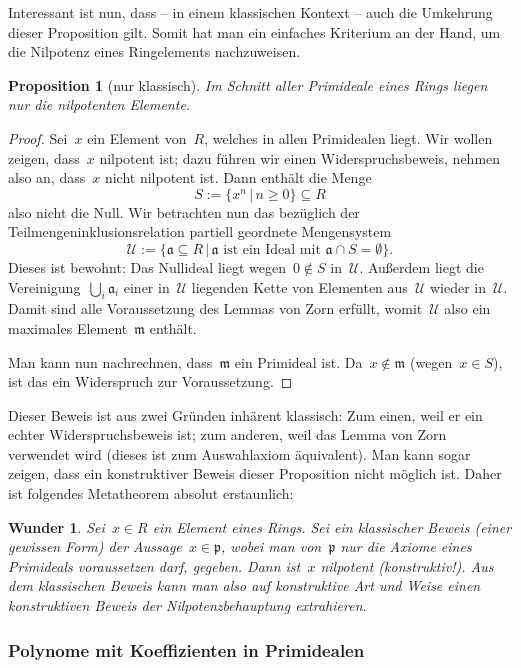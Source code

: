 \documentclass[a4paper,ngerman,12pt]{scrartcl}
\theoremstyle{definition}
\theoremstyle{plain}
\newtheorem{prop}[defn]{Proposition}
\newtheorem{wunder}[defn]{Wunder}
\theoremstyle{remark}
\renewcommand{\aa}{\mathfrak{a}}
\newcommand{\pp}{\mathfrak{p}}
\newcommand{\mm}{\mathfrak{m}}
\newcommand{\U}{\mathcal{U}}
\renewcommand{\_}{\mathpunct{.}\,}
\newcommand{\?}{\,{:}\,}
\begin{document}
Interessant ist nun, dass -- in einem klassischen Kontext -- auch die Umkehrung
dieser Proposition gilt. Somit hat man ein einfaches Kriterium an der Hand, um
die Nilpotenz eines Ringelements nachzuweisen.

\begin{prop}[nur klassisch]\label{intersectprim}%
Im Schnitt aller Primideale eines Rings liegen nur
die nilpotenten Elemente.\end{prop}
\begin{proof}Sei~$x$ ein Element von~$R$, welches in allen Primidealen liegt.
Wir wollen zeigen, dass~$x$ nilpotent ist; dazu führen wir einen
Widerspruchsbeweis, nehmen also an, dass~$x$ nicht nilpotent ist. Dann enthält
die Menge
\[ S := \{ x^n \,|\, n \geq 0 \} \subseteq R \]
also nicht die Null. Wir betrachten nun das bezüglich der
Teilmengeninklusionsrelation partiell geordnete Mengensystem
\[ \U := \{ \aa \subseteq R \,|\, \text{$\aa$ ist ein Ideal mit~$\aa \cap S =
\emptyset$} \}. \]
Dieses ist bewohnt: Das Nullideal liegt wegen~$0 \not\in S$ in~$\U$. Außerdem
liegt die Vereinigung~$\bigcup_i \aa_i$ einer in~$\U$ liegenden Kette von
Elementen aus~$\U$ wieder in~$\U$. Damit sind alle Voraussetzung des Lemmas von
Zorn erfüllt, womit~$\U$ also ein maximales Element~$\mm$ enthält.

Man kann nun nachrechnen, dass~$\mm$ ein Primideal ist. Da~$x \not\in \mm$
(wegen~$x \in S$), ist das ein Widerspruch zur Voraussetzung.
\end{proof}

Dieser Beweis ist aus zwei Gründen inhärent klassisch: Zum einen, weil
er ein echter Widerspruchsbeweis ist; zum anderen, weil das Lemma von Zorn
verwendet wird (dieses ist zum Auswahlaxiom äquivalent). Man kann sogar zeigen,
dass ein konstruktiver Beweis dieser Proposition nicht möglich ist. Daher
ist folgendes Metatheorem absolut erstaunlich:

\begin{wunder}Sei~$x \in R$ ein Element eines Rings. Sei ein \emph{klassischer
Beweis} (einer gewissen Form) der Aussage~$x \in \pp$, wobei man von~$\pp$ nur
die Axiome eines Primideals voraussetzen darf, gegeben. Dann ist~$x$ nilpotent
(konstruktiv!). Aus dem klassischen Beweis kann man also auf konstruktive Art
und Weise einen konstruktiven Beweis der Nilpotenzbehauptung extrahieren.
\end{wunder}


\subsubsection*{Polynome mit Koeffizienten in Primidealen}
\end{document}
